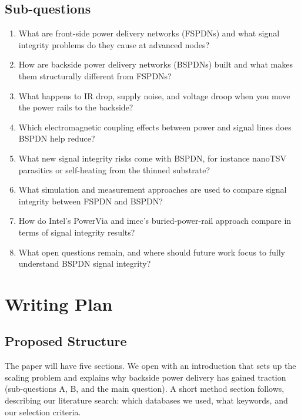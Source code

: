 \documentclass[conference,a4paper]{IEEEtran}
\begin{document}
\subsection{Sub-questions}
\begin{enumerate}
    \item[A.] What are front-side power delivery networks (FSPDNs) and what signal integrity problems do they cause at advanced nodes?
    \item[B.] How are backside power delivery networks (BSPDNs) built and what makes them structurally different from FSPDNs?
    \item[C.] What happens to IR drop, supply noise, and voltage droop when you move the power rails to the backside?
    \item[D.] Which electromagnetic coupling effects between power and signal lines does BSPDN help reduce?
    \item[E.] What new signal integrity risks come with BSPDN, for instance nanoTSV parasitics or self-heating from the thinned substrate?
    \item[F.] What simulation and measurement approaches are used to compare signal integrity between FSPDN and BSPDN?
    \item[G.] How do Intel's PowerVia and imec's buried-power-rail approach compare in terms of signal integrity results?
    \item[H.] What open questions remain, and where should future work focus to fully understand BSPDN signal integrity?
\end{enumerate}

\section{Writing Plan}

\subsection{Proposed Structure}

The paper will have five sections. We open with an introduction that sets up the scaling problem and explains why backside power delivery has gained traction (sub-questions A, B, and the main question). A short method section follows, describing our literature search: which databases we used, what keywords, and our selection criteria.
\end{document}

